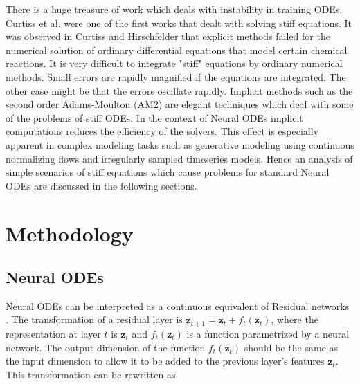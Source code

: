 There is a huge treasure of work which deals with instability in training ODEs\cite{dahlquist198533,dahlquist1976error}. Curtiss et al. \cite{curtiss1952integration} were one of the first works that dealt with solving stiff equations. It was observed in Curtiss and Hirschfelder \cite{curtiss1952integration} that explicit methods failed for the numerical solution of ordinary differential equations that model certain chemical reactions. It is very difficult to integrate "stiff" equations by ordinary numerical methods. Small errors are rapidly magnified if the equations are integrated. The other case might be that the errors oscillate rapidly. Implicit methods such as the second order Adams-Moulton (AM2) \cite{wanner1996solving} are elegant techniques which deal with some of the problems of stiff ODEs. In the context of Neural ODEs\cite{chen2018neural} implicit computations reduces the efficiency of the solvers. This effect is especially apparent in complex modeling tasks such as generative modeling using continuous normalizing flows\cite{grathwohl2018ffjord} and irregularly sampled timeseries models\cite{rubanova2019latent}. Hence an analysis of simple scenarios of stiff equations which cause problems for standard Neural ODEs are discussed in the following sections.  


\section{Methodology}

\subsection{Neural ODEs}
Neural ODEs can be interpreted as a continuous equivalent of Residual networks \cite{he2016deep}. The transformation of a residual layer is $\mathbf{z}_{t+1}= \mathbf{z}_t + f_t(\mathbf{z}_t)$, where the representation at layer $t$ is $\mathbf{z}_t$ and $f_t( \mathbf{z}_t)$ is a function parametrized by a neural network. The output dimension of the function $f_t(\mathbf{z}_t)$ should be the same as the input dimension to allow it to be added to the previous layer's features $\mathbf{z}_t$. This transformation can be rewritten as

